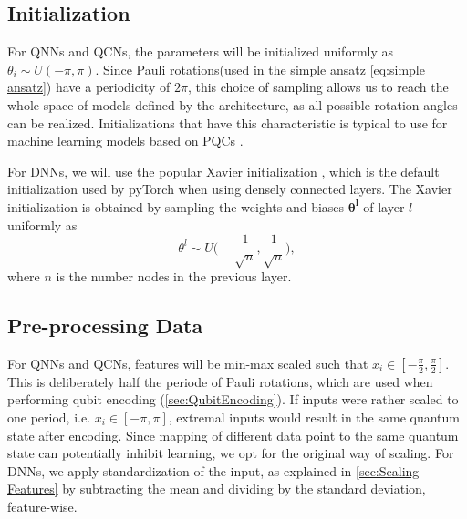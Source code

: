\subsection{Initialization}\label{sec:Initialization}
For QNNs and QCNs, the parameters will be initialized uniformly as $\theta_i \sim U(-\pi, \pi)$. Since Pauli rotations(used in the simple ansatz \autoref{eq:simple ansatz}) have a periodicity of $2\pi$, this choice of sampling allows us to reach the whole space of models defined by the architecture, as all possible rotation angles can be realized. Initializations that have this characteristic is typical to use for machine learning models based on PQCs \cite{abbas2020power}\cite{skolik2020layerwise}.

For DNNs, we will use the popular Xavier initialization \cite{xavier}, which is the default initialization used by pyTorch\cite{pytorch} when using densely connected layers. The Xavier initialization is obtained by sampling the weights and biases $\boldsymbol{\theta^{l}}$ of layer $l$ uniformly as 
\begin{equation}
    \theta^{l} \sim U\big(-\frac{1}{\sqrt{n}},\frac{1}{\sqrt{n}}\big),
\end{equation}
where $n$ is the number nodes in the previous layer. 

\subsection{Pre-processing Data}\label{sec:Pre-processing Input}
For QNNs and QCNs, features will be min-max scaled such that $x_i \in [-\frac{\pi}{2}, \frac{\pi}{2}]$. This is deliberately half the periode of Pauli rotations, which are used when performing qubit encoding (\autoref{sec:QubitEncoding}). If inputs were rather scaled to one period, i.e. $x_i \in [-\pi, \pi]$, extremal inputs would result in the same quantum state after encoding. Since mapping of different data point to the same quantum state can potentially inhibit learning, we opt for the original way of scaling. 
For DNNs, we apply standardization of the input, as explained in \autoref{sec:Scaling Features} by subtracting the mean and dividing by the standard deviation, feature-wise.

